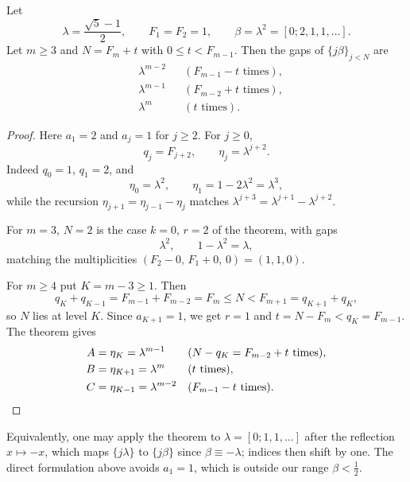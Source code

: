 \begin{corollary}\label{gap:cor:golden}
Let
\[
\lambda=\frac{\sqrt5-1}2,\qquad F_1=F_2=1,\qquad \beta=\lambda^2=[0;2,1,1,\dots].
\]
Let $m\ge3$ and $N=F_m+t$ with $0\le t<F_{m-1}$. Then the gaps of $\{j\beta\}_{j<N}$ are
\begin{align*}
&\lambda^{m-2} &&(F_{m-1}-t\text{ times}),\\
&\lambda^{m-1} &&(F_{m-2}+t\text{ times}),\\
&\lambda^{m} &&(t\text{ times}).
\end{align*}
\end{corollary}
\begin{proof}
Here $a_1=2$ and $a_j=1$ for $j\ge2$. For $j\ge0$,
\begin{equation}\label{gap:eq:goldid}
q_j=F_{j+2},\qquad \eta_j=\lambda^{j+2}.
\end{equation}
Indeed $q_0=1$, $q_1=2$, and
\[
\eta_0=\lambda^2,\qquad \eta_1=1-2\lambda^2=\lambda^3,
\]
while the recursion $\eta_{j+1}=\eta_{j-1}-\eta_j$ matches $\lambda^{j+3}=\lambda^{j+1}-\lambda^{j+2}$.

For $m=3$, $N=2$ is the case $k=0$, $r=2$ of the theorem, with gaps
\[
\lambda^2,\qquad 1-\lambda^2=\lambda,
\]
matching the multiplicities $(F_2-0,\,F_1+0,\,0)=(1,1,0)$.

For $m\ge4$ put $K=m-3\ge1$. Then
\[
q_K+q_{K-1}=F_{m-1}+F_{m-2}=F_m\le N<F_{m+1}=q_{K+1}+q_K,
\]
so $N$ lies at level $K$. Since $a_{K+1}=1$, we get $r=1$ and $t=N-F_m<q_K=F_{m-1}$.
The theorem gives
\begin{align*}
A&=\eta_K=\lambda^{m-1} &&(N-q_K=F_{m-2}+t\text{ times}),\\
B&=\eta_{K+1}=\lambda^{m} &&(t\text{ times}),\\
C&=\eta_{K-1}=\lambda^{m-2} &&(F_{m-1}-t\text{ times}).\qedhere
\end{align*}
\end{proof}
Equivalently, one may apply the theorem to $\lambda=[0;1,1,\dots]$ after the reflection $x\mapsto-x$, which maps $\{j\lambda\}$ to $\{j\beta\}$ since $\beta\equiv-\lambda$; indices then shift by one. The direct formulation above avoids $a_1=1$, which is outside our range $\beta<\tfrac12$.

